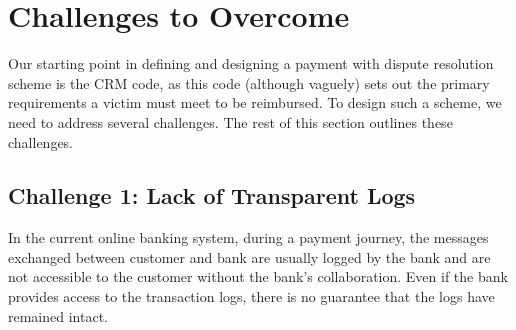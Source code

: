 
\vspace{-1mm}
\section{Challenges to Overcome}\label{sec:: challenges}


Our starting point in defining and designing a payment with dispute resolution scheme is the CRM code, as this code (although vaguely) sets out the primary requirements a victim must meet to be reimbursed.  To design such a scheme, we need to address several challenges. The rest of this section outlines these challenges. 




\vspace{-1.1mm}
\subsection{Challenge 1: Lack of Transparent Logs} 
In the current online banking system, during a payment journey, the messages exchanged between customer and bank are usually logged by the bank and are not accessible to the customer without the bank's collaboration. Even if the bank provides access to the transaction logs, there is no guarantee that the logs have remained intact.

